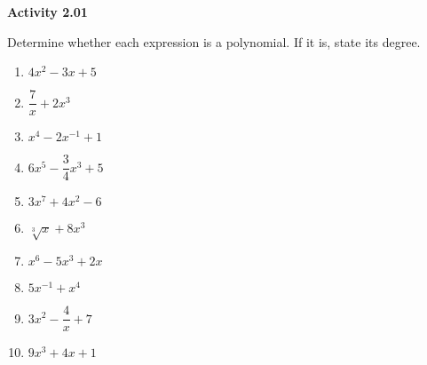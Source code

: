 \vspace{0.3ex}
\noindent\textbf{Activity 2.01}

\vspace{0.2ex}

Determine whether each expression is a polynomial. If it is, state its degree.
\begin{multicols}{2}
\begin{enumerate}
    \item $4x^2 - 3x + 5$
    \item $\dfrac{7}{x} + 2x^3$
    \item $x^4 - 2x^{-1} + 1$
    \item $6x^5 - \dfrac{3}{4}x^3 + 5$
    \item $3x^7 + 4x^2 - 6$
    \item $\sqrt[3]{x} + 8x^3$
    \item $x^6 - 5x^3 + 2x$
    \item $5x^{-1} + x^4$
    \item $3x^2 - \dfrac{4}{x} + 7$
    \item $9x^3 + 4x + 1$
\end{enumerate}
\end{multicols}
